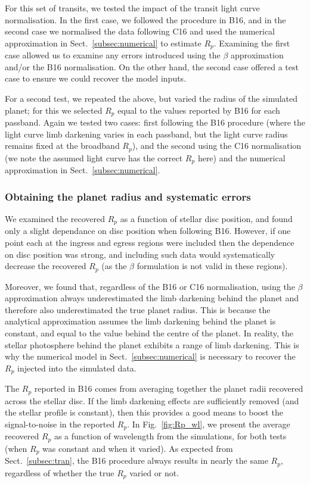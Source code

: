 \documentclass{aa}
\begin{document}
For this set of transits, we tested the impact of the transit light curve normalisation. In the first case, we followed the procedure in B16, and in the second case we normalised the data following C16 and used the numerical approximation in Sect.~\ref{subsec:numerical} to estimate $R_p$. Examining the first case allowed us to examine any errors introduced using the $\beta$ approximation and/or the B16 normalisation. On the other hand, the second case offered a test case to ensure we could recover the model inputs. 

For a second test, we repeated the above, but varied the radius of the simulated planet; for this we selected $R_p$ equal to the values reported by B16 for each passband. Again we tested two cases: first following the B16 procedure (where the light curve limb darkening varies in each passband, but the light curve radius remains fixed at the broadband $R_p$), and the second using the C16 normalisation (we note the assumed light curve has the correct $R_p$ here) and the numerical approximation in Sect.~\ref{subsec:numerical}.  

\vspace{-10pt}
\subsubsection{Obtaining the planet radius and systematic errors}
\label{sec:recover}
We examined the recovered $R_p$ as a function of stellar disc position, and found only a slight dependance on disc position when following B16. However, if one point each at the ingress and egress regions were included then the dependence on disc position was strong, and including such data would systematically decrease the recovered $R_p$ (as the $\beta$ formulation is not valid in these regions).

Moreover, we found that, regardless of the B16 or C16 normalisation, using the $\beta$ approximation always underestimated the limb darkening behind the planet and therefore also underestimated the true planet radius. This is because the analytical approximation assumes the limb darkening behind the planet is constant, and equal to the value behind the centre of the planet. In reality, the stellar photosphere behind the planet exhibits a range of limb darkening. This is why the numerical model in Sect.~\ref{subsec:numerical} is necessary to recover the $R_p$ injected into the simulated data.

The $R_p$ reported in B16 comes from averaging together the planet radii recovered across the stellar disc. If the limb darkening effects are sufficiently removed (and the stellar profile is constant), then this provides a good means to boost the signal-to-noise in the reported $R_p$. In Fig.~\ref{fig:Rp_wl}, we present the average recovered $R_p$ as a function of wavelength from the simulations, for both tests (when $R_p$ was constant and when it varied). As expected from Sect.~\ref{subsec:tran}, the B16 procedure always results in nearly the same $R_p$, regardless of whether the true $R_p$ varied or not. 
\end{document}
